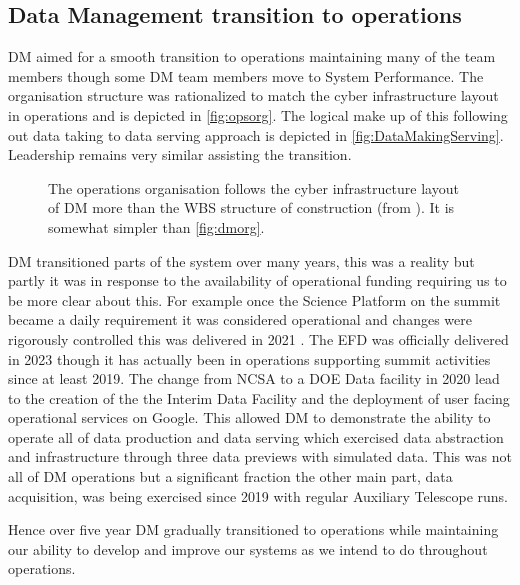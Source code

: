 \subsection{ Data Management transition to operations} \label{sec:transition}

DM aimed for a smooth transition to operations maintaining many of the team members though some DM team members move to System Performance.
The organisation structure was rationalized to match the cyber infrastructure layout in operations and is depicted in \autoref{fig:opsorg}.
The logical make up of this following out data taking to data serving approach is depicted in \autoref{fig:DataMakingServing}.
Leadership remains very similar assisting the transition.

\begin{figure*}[ht]
\caption{ The operations organisation follows the cyber infrastructure layout of DM more than the WBS structure of construction (from \cite{RTN-046}).
 It is somewhat simpler than \autoref{fig:dmorg}.  \label{fig:opsorg}}
\end{figure*}


DM transitioned parts of the system over many years, this was a reality  but partly it was in response to the availability of operational funding requiring us to be more clear about this.
For example once the Science Platform on the summit became a daily requirement it was considered operational and changes were rigorously controlled
this was delivered in 2021 \citep{RTN-019}.
The EFD was officially delivered in 2023 though it has actually been in operations supporting summit activities  since at least 2019.
The change from NCSA to a DOE Data facility in 2020 lead to the creation of the the Interim Data Facility  and the deployment of user facing operational services on Google\citep{2021arXiv211115030O}.
This allowed DM to demonstrate the ability to operate all  of data production and  data serving  which exercised data abstraction and infrastructure through three data previews with simulated data.
This was not all of DM operations but a significant fraction the other main part, data acquisition, was being exercised since 2019 with regular Auxiliary Telescope runs.

Hence over five year DM gradually transitioned to operations while maintaining our ability to develop and improve our systems as we intend to do throughout operations.

